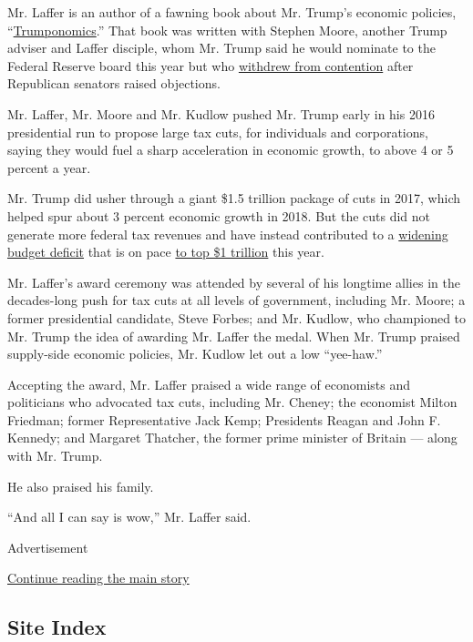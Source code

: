 Mr. Laffer is an author of a fawning book about Mr. Trump's economic
policies,
``\href{https://www.amazon.com/Trumponomics-Inside-America-Revive-Economy/dp/1250193710}{Trumponomics}.''
That book was written with Stephen Moore, another Trump adviser and
Laffer disciple, whom Mr. Trump said he would nominate to the Federal
Reserve board this year but who
\href{https://www.nytimes.com/2019/05/02/business/stephen-moore-fed.html}{withdrew
from contention} after Republican senators raised objections.

Mr. Laffer, Mr. Moore and Mr. Kudlow pushed Mr. Trump early in his 2016
presidential run to propose large tax cuts, for individuals and
corporations, saying they would fuel a sharp acceleration in economic
growth, to above 4 or 5 percent a year.

Mr. Trump did usher through a giant \$1.5 trillion package of cuts in
2017, which helped spur about 3 percent economic growth in 2018. But the
cuts did not generate more federal tax revenues and have instead
contributed to a
\href{https://www.nytimes.com/2019/01/11/business/trump-tax-cuts-revenue.html}{widening
budget deficit} that is on pace
\href{https://www.nytimes.com/2019/01/08/us/politics/budget-deficit-trillion.html}{to
top \$1 trillion} this year.

Mr. Laffer's award ceremony was attended by several of his longtime
allies in the decades-long push for tax cuts at all levels of
government, including Mr. Moore; a former presidential candidate, Steve
Forbes; and Mr. Kudlow, who championed to Mr. Trump the idea of awarding
Mr. Laffer the medal. When Mr. Trump praised supply-side economic
policies, Mr. Kudlow let out a low ``yee-haw.''

Accepting the award, Mr. Laffer praised a wide range of economists and
politicians who advocated tax cuts, including Mr. Cheney; the economist
Milton Friedman; former Representative Jack Kemp; Presidents Reagan and
John F. Kennedy; and Margaret Thatcher, the former prime minister of
Britain --- along with Mr. Trump.

He also praised his family.

``And all I can say is wow,'' Mr. Laffer said.

Advertisement

\protect\hyperlink{after-bottom}{Continue reading the main story}

\hypertarget{site-index}{%
\subsection{Site Index}\label{site-index}}

